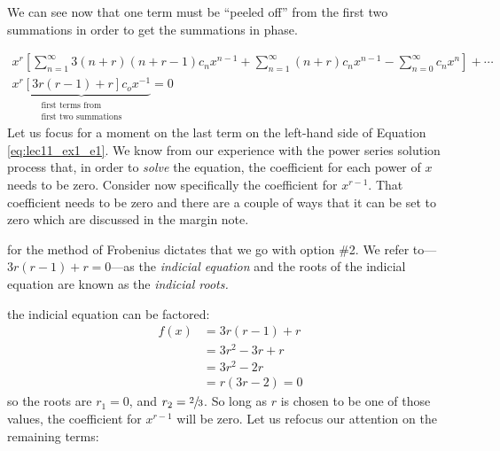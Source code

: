 
\noindent We can see now that one term must be ``peeled off'' from the first two summations in order to get the summations in phase. 


\begin{multline}
x^r \left[\sum\limits_{n=1}^{\infty} 3(n+r)(n+r-1)c_nx^{n-1} + \sum\limits_{n=1}^{\infty} (n+r)c_nx^{n-1} - \sum\limits_{n=0}^{\infty}c_nx^n \right] + \cdots \\
\underbrace{x^r\left[3r(r-1) + r \right]c_ox^{-1}}_{\substack{\text{first terms from} \\ \text{first two summations}}} = 0
\label{eq:lec11_ex1_e1}
\end{multline}
Let us focus for a moment on the last term on the left-hand side of Equation \ref{eq:lec11_ex1_e1}.  We know from our experience with the power series solution process that, in order to \emph{solve} the equation, the coefficient for each power of $x$ needs to be zero.  Consider now specifically the coefficient for $x^{r-1}$.  That coefficient needs to be zero and there are a couple of ways that it can be set to zero which are discussed in the margin note.

 for the method of Frobenius dictates that we go with option \#2.  We refer to---$3r(r-1)+r = 0$---as the \emph{indicial equation} and the roots of the indicial equation are known as the \emph{indicial roots.} 

 the indicial equation can be factored:
\begin{align*}
f(x) &= 3r(r-1)+r \\
&=3r^2-3r+r \\
&=3r^2-2r \\
&=r(3r-2) = 0
\end{align*}
so the roots are $r_1=0$, and $r_2 = \sfrac{2}{3}$. So long as $r$ is chosen to be one of those values, the coefficient for $x^{r-1}$ will be zero.  Let us refocus our attention on the remaining terms:

